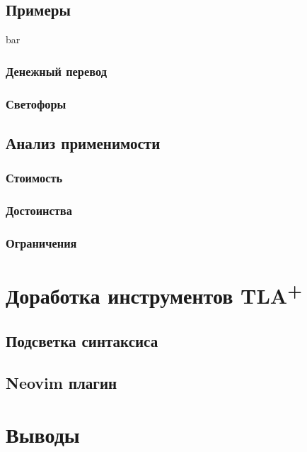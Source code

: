 \documentclass[14pt, openany]{book}
\newcommand{\tlapl}{TLA\textsuperscript{+} }
\begin{document}
\section{Примеры}
bar

\subsection{Денежный перевод}

\subsection{Светофоры}

\section{Анализ применимости}

\subsection{Стоимость}

\subsection{Достоинства}

\subsection{Ограничения}

\chapter{Доработка инструментов \tlapl}

\section{Подсветка синтаксиса}

\section{Neovim плагин}

\chapter{Выводы}



\end{document}
